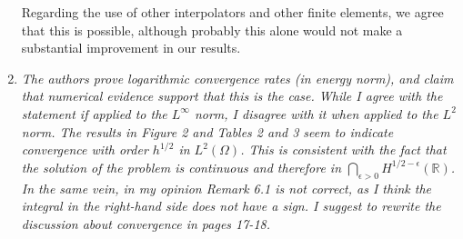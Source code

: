 \documentclass[11 pt]{article}
\numberwithin{equation}{section}
\def\r{\mathbb{R}}
\def\eps{\varepsilon}
\begin{document}
\begin{enumerate}
    Regarding the use of other interpolators and other finite elements, we agree that this is possible, although probably this alone would not make a substantial improvement in our results.


    \item \emph{The authors prove logarithmic convergence rates (in energy norm), and claim that numerical evidence support that this is the case. While I agree with the statement if applied to the \(L^{\infty}\) norm, I disagree with it when applied to the \(L^{2}\) norm. The results in Figure 2 and Tables 2 and 3 seem to indicate convergence with order \(h^{1/2}\) in \(L^{2}(\Omega)\). This is consistent with the fact that the solution of the problem is continuous and therefore in \(\bigcap_{\epsilon>0}H^{1/2-\epsilon}(\mathbb{R})\). In the same vein, in my opinion Remark 6.1 is not correct, as I think the integral in the right-hand side does not have a sign. I suggest to rewrite the discussion about convergence in pages 17-18.}

%
%


\end{enumerate}
\end{document}
